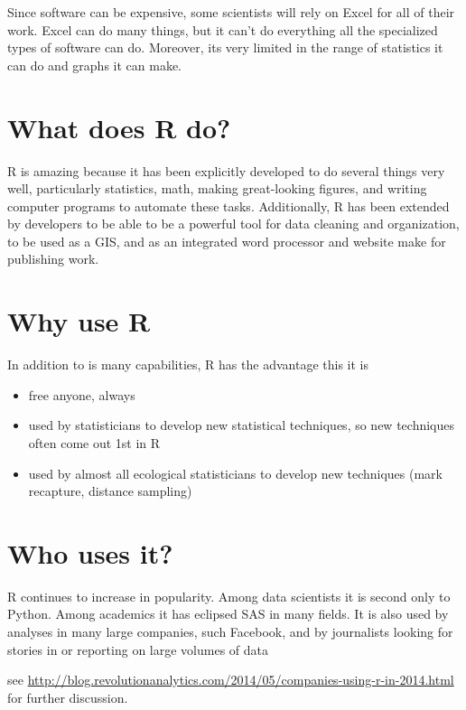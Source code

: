 \documentclass[]{book}
\providecommand{\tightlist}{%
  \setlength{\itemsep}{0pt}\setlength{\parskip}{0pt}}
\theoremstyle{definition}
\theoremstyle{definition}
\theoremstyle{definition}
\theoremstyle{remark}
\begin{document}
Since software can be expensive, some scientists will rely on Excel for
all of their work. Excel can do many things, but it can't do everything
all the specialized types of software can do. Moreover, its very limited
in the range of statistics it can do and graphs it can make.

\section{What does R do?}\label{what-does-r-do}

R is amazing because it has been explicitly developed to do several
things very well, particularly statistics, math, making great-looking
figures, and writing computer programs to automate these tasks.
Additionally, R has been extended by developers to be able to be a
powerful tool for data cleaning and organization, to be used as a GIS,
and as an integrated word processor and website make for publishing
work.

\section{Why use R}\label{why-use-r}

In addition to is many capabilities, R has the advantage this it is

\begin{itemize}
\tightlist
\item
  free anyone, always
\item
  used by statisticians to develop new statistical techniques, so new
  techniques often come out 1st in R
\item
  used by almost all ecological statisticians to develop new techniques
  (mark recapture, distance sampling)
\end{itemize}

\section{Who uses it?}\label{who-uses-it}

R continues to increase in popularity. Among data scientists it is
second only to Python. Among academics it has eclipsed SAS in many
fields. It is also used by analyses in many large companies, such
Facebook, and by journalists looking for stories in or reporting on
large volumes of data

see
\url{http://blog.revolutionanalytics.com/2014/05/companies-using-r-in-2014.html}
for further discussion.
\end{document}
